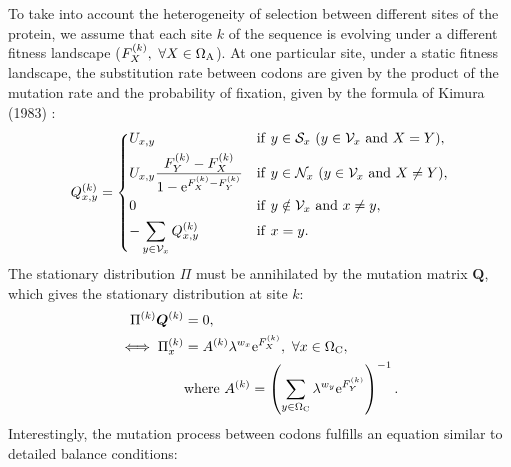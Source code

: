 To take into account the heterogeneity of selection between different sites of the protein, we assume that each site $k$ of the sequence is evolving under a different fitness landscape ($F_X^{(k)}, \ \forall X \in \Omega_{\mathrm{A}} $).
At one particular site, under a static fitness landscape, the substitution rate between codons are given by the product of the mutation rate and the probability of fixation, given by the formula of Kimura (1983) \citep{kimura_neutral_1983}:
\begin{equation}
\label{codonSubRates}
Q_{x, y}^{(k)} =
\begin{dcases}
U_{x, y}
& \mathrm{if} \ y \in \mathcal{S}_x \ (y \in \mathcal{V}_x \ \mathrm{and} \ X = Y),  \\
U_{x, y} \dfrac{F_Y^{(k)} - F_X^{(k)}}{1 - \mathrm{e}^{F_X^{(k)} - F_Y^{(k)}}}
& \mathrm{if} \ y \in \mathcal{N}_x \ (y \in \mathcal{V}_x \ \mathrm{and} \ X \neq Y),  \\
0
& \mathrm{if} \  y \notin \mathcal{V}_x \ \mathrm{ and } \ x \neq y, \\
- \sum_{y \in \mathcal{V}_x }  Q_{x, y}^{(k)}
& \mathrm{if} \ x = y.  \\
\end{dcases}
\end{equation}
The stationary distribution $\Pi$ must be annihilated by the mutation matrix $\bm{Q}$, which gives the stationary distribution at site $k$:
\begin{align}
\Pi^{(k)} \bm{Q}^{(k)}
& =0 ,\\
\iff \Pi_x^{(k)}
& =A^{(k)} \lambda^{w_x} \mathrm{e}^{F_X^{(k)}} ,\ \forall x \in \Omega_{\mathrm{C}},\\
& \mathrm{ where } \ A^{(k)} = \left( \sum_{y \in \Omega_{\mathrm{C}}} \lambda^{w_y} \mathrm{e}^{F_Y^{(k)}} \right)^{-1}.
\label{codonStationarity}
\end{align}
Interestingly, the mutation process between codons fulfills an equation similar to detailed balance conditions:
